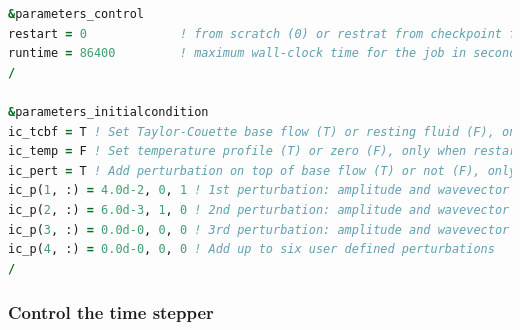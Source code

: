 \documentclass[a4paper, 11pt, DIV=11]{scrartcl}
\begin{document}
\begin{lstlisting}[language=fortran]
&parameters_control
restart = 0             ! from scratch (0) or restrat from checkpoint file (1,2)
runtime = 86400         ! maximum wall-clock time for the job in seconds
/

&parameters_initialcondition
ic_tcbf = T ! Set Taylor-Couette base flow (T) or resting fluid (F), only when restart = 0
ic_temp = F ! Set temperature profile (T) or zero (F), only when restart = 0, only TE_CODE
ic_pert = T ! Add perturbation on top of base flow (T) or not (F), only when restart = 0
ic_p(1, :) = 4.0d-2, 0, 1 ! 1st perturbation: amplitude and wavevector (a1, k_th1, k_z1)
ic_p(2, :) = 6.0d-3, 1, 0 ! 2nd perturbation: amplitude and wavevector (a2, k_th2, k_z2)
ic_p(3, :) = 0.0d-0, 0, 0 ! 3rd perturbation: amplitude and wavevector (a3, k_th3, k_z3)
ic_p(4, :) = 0.0d-0, 0, 0 ! Add up to six user defined perturbations
/
\end{lstlisting}

\subsubsection{Control the time stepper}
\label{sec:controlTimeStepper}
\end{document}
